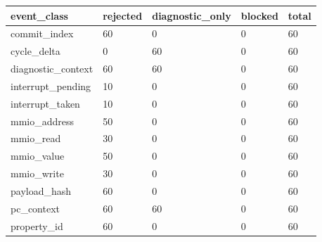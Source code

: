 \begin{tabular}{lllll}
 \hline
event\_class & rejected & diagnostic\_only & blocked & total \\
 \hline
commit\_index & 60 & 0 & 0 & 60 \\
cycle\_delta & 0 & 60 & 0 & 60 \\
diagnostic\_context & 60 & 60 & 0 & 60 \\
interrupt\_pending & 10 & 0 & 0 & 60 \\
interrupt\_taken & 10 & 0 & 0 & 60 \\
mmio\_address & 50 & 0 & 0 & 60 \\
mmio\_read & 30 & 0 & 0 & 60 \\
mmio\_value & 50 & 0 & 0 & 60 \\
mmio\_write & 30 & 0 & 0 & 60 \\
payload\_hash & 60 & 0 & 0 & 60 \\
pc\_context & 60 & 60 & 0 & 60 \\
property\_id & 60 & 0 & 0 & 60 \\
 \hline
\end{tabular}
